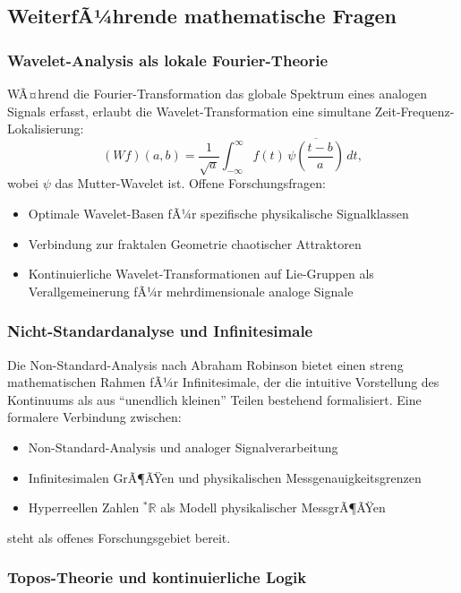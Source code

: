 ﻿\documentclass[a4paper,12pt]{article}
\theoremstyle{definition}
\begin{document}
\subsection{WeiterfÃ¼hrende mathematische Fragen}

\subsubsection{Wavelet-Analysis als lokale Fourier-Theorie}

WÃ¤hrend die Fourier-Transformation das globale Spektrum eines analogen Signals
erfasst, erlaubt die Wavelet-Transformation eine simultane Zeit-Frequenz-Lokalisierung:
\[
(Wf)(a,b) = \frac{1}{\sqrt{a}} \int_{-\infty}^\infty f(t) \, \overline{\psi\!\left(\frac{t-b}{a}\right)} \, dt,
\]
wobei $\psi$ das Mutter-Wavelet ist.  Offene Forschungsfragen:
\begin{itemize}
    \item Optimale Wavelet-Basen fÃ¼r spezifische physikalische Signalklassen
    \item Verbindung zur fraktalen Geometrie chaotischer Attraktoren
    \item Kontinuierliche Wavelet-Transformationen auf Lie-Gruppen
          als Verallgemeinerung fÃ¼r mehrdimensionale analoge Signale
\end{itemize}

\subsubsection{Nicht-Standardanalyse und Infinitesimale}

Die Non-Standard-Analysis nach Abraham Robinson \citep{Robinson1966} bietet
einen streng mathematischen Rahmen fÃ¼r Infinitesimale, der die intuitive
Vorstellung des Kontinuums als aus ``unendlich kleinen'' Teilen bestehend
formalisiert.  Eine formalere Verbindung zwischen:
\begin{itemize}
    \item Non-Standard-Analysis und analoger Signalverarbeitung
    \item Infinitesimalen GrÃ¶ÃŸen und physikalischen Messgenauigkeitsgrenzen
    \item Hyperreellen Zahlen ${}^*\mathbb{R}$ als Modell physikalischer MessgrÃ¶ÃŸen
\end{itemize}
steht als offenes Forschungsgebiet bereit.

\subsubsection{Topos-Theorie und kontinuierliche Logik}
\end{document}
